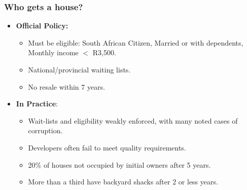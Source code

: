 \documentclass[aspectratio=32]{beamer}
\begin{document}
\begin{frame}
\frametitle{Who gets a house?}
  \begin{itemize}
    \item<1-> {\bf Official Policy:}
    \vspace{2mm} 
      \begin{itemize}
        \item Must be eligible: South African Citizen, Married or with dependents, Monthly income $<$ R3,500.
        \vspace{1mm}
        \item National/provincial waiting lists.
        \vspace{1mm}
        \item No resale within 7 years.
      \end{itemize}
    \vspace{2mm}
    \item<2-> {\bf In Practice}:
      \begin{itemize}
        \vspace{2mm} 
        \item Wait-lists and eligibility weakly enforced, with many noted cases of corruption.
        \vspace{1mm}
        \item Developers often fail to meet quality requirements.
        \vspace{1mm}
        \item 20\% of houses not occupied by initial owners after 5 years.
        \vspace{1mm}
        \item More than a third have backyard shacks after 2 or less years.
      \end{itemize}
  \end{itemize}

\end{frame}

\end{document}

